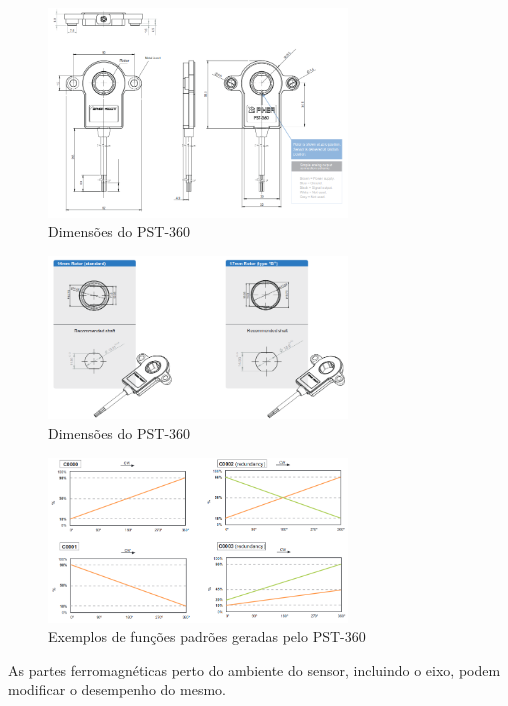 \begin{figure}[h]
  \centering
  \includegraphics[width=300px, scale=1]{figuras/pst_dimensoes}
  \caption{ Dimensões do PST-360 \cite{sensor_rotacao}}
\label{fig:pst_dimensoes}
\end{figure}

\begin{figure}[h]
  \centering
  \includegraphics[width=300px, scale=1]{figuras/pst_dimensoes2}
  \caption{ Dimensões do PST-360 \cite{sensor_rotacao}}
\label{fig:pst_dimensoes2}
\end{figure}


\begin{figure}[h]
  \centering
  \includegraphics[width=300px, scale=1]{figuras/pst_saida_padrao}
  \caption{ Exemplos de funções padrões geradas pelo PST-360 \cite{sensor_rotacao}}
\label{fig:pst_saida_padrao}
\end{figure}

As partes ferromagnéticas perto do ambiente do sensor, incluindo o eixo,
podem modificar o desempenho do mesmo.







